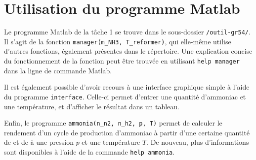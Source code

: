 \section{Utilisation du programme Matlab}

Le programme Matlab de la tâche 1 se trouve dans le sous-dossier \texttt{/outil-gr54/}. Il s'agit de la fonction \texttt{manager(m\_NH3, T\_reformer)}, qui elle-même utilise d'autres fonctions, également présentes dans le répertoire. Une explication concise du fonctionnement de la fonction peut être trouvée en utilisant \texttt{help manager} dans la ligne de commande Matlab.

Il est également possible d'avoir recours à une interface graphique simple à l'aide du programme \texttt{interface}. Celle-ci permet d'entrer une quantité d'ammoniac et une température, et d'afficher le résultat dans un tableau.

Enfin, le programme \texttt{ammonia(n\_n2, n\_h2, p, T)} permet de calculer le rendement d'un cycle de production d'ammoniac à partir d'une certaine quantité de  et de  à une pression $p$ et une température $T$. De nouveau, plus d'informations sont disponibles à l'aide de la commande \texttt{help ammonia}.
